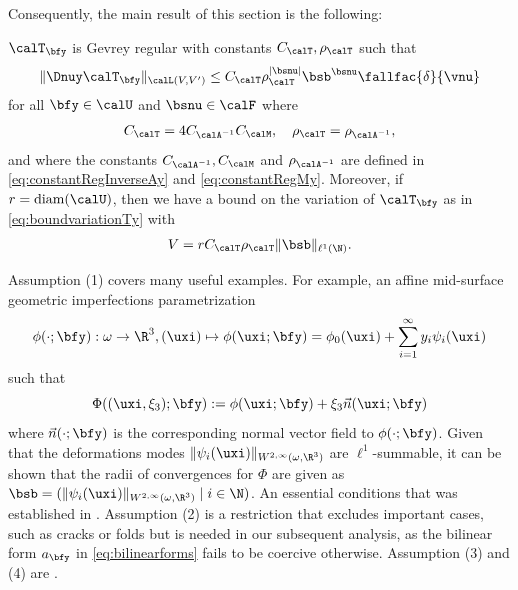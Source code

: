 
Consequently, the main result of this section is
the following:

\begin{lemma}\label{lemma:GevreyRegularityTy}
$\calT_{\bfy}$ is Gevrey regular with constants $C_{\calT}, \rho_{\calT}$
such that 
\begin{align*}
   \| \Dnuy  \calT_{\bfy} \|_{\calL(V,V')} 
   \leq  C_{\calT} \rho_{\calT}^{\vert \bsnu \vert}\bsb^{\bsnu} \fallfac{\delta}{\vnu} 
\end{align*}
for all $\bfy \in \calU$ and $\bsnu \in \calF$ where
\begin{align}\label{eq:constantRegTy}
    C_{\calT} = 4C_{\calA^{-1}} C_{\calM}, \quad  \rho_{\calT}= \rho_{\calA^{-1}},
\end{align}
and where the constants $C_{\calA^{-1}},C_{\calM}$ and $\rho_{\calA^{-1}}$ are defined in \eqref{eq:constantRegInverseAy} and \eqref{eq:constantRegMy}.
Moreover, if $r = \text{diam}(\calU)$, then we have a bound on the variation of $\calT_\bfy$ as in \eqref{eq:boundvariationTy} with
\begin{align*}
    V = r C_\calT \rho_{\calT}  \| \bsb \|_{\ell^1(\N)}.
\end{align*}
\end{lemma}
\begin{remark}
    Assumption (1) covers many useful examples. For example, an affine mid-surface geometric imperfections parametrization
    \begin{equation*}     
   \phi(\cdot;\bfy): \omega \to \R^3, (\uxi) \mapsto \phi(\uxi;\bfy) = \phi_0(\uxi) +  \sum_{i =1 }^\infty y_i \psi_i(\uxi)
    \end{equation*}
    such that 
    \begin{equation*}
        \Phi ((\uxi,\xi_3) ; \bfy) := \phi(\uxi;\bfy) + \xi_3 \vec n(\uxi;\bfy)
    \end{equation*}
    where $ \vec n(\cdot;\bfy)$ is the corresponding normal vector field to $\phi(\cdot;\bfy)$.
    Given that the deformations modes $ \| \psi_i(\uxi) \|_{W^{2,\infty}(\omega,\R^3)} $ are $\ell^1$-summable, it can be shown that the radii of convergences for $\Phi$ are given as 
    $\bsb = (\| \psi_i(\uxi) \|_{W^{2,\infty}(\omega,\R^3)}   \mid i \in \N ) $. An essential conditions that was established in \cite{GIANI2025118081}.
    Assumption (2) is a restriction that excludes important cases, such as cracks or folds but is needed in our subsequent analysis, as the bilinear form $a_\bfy$ in \eqref{eq:bilinearforms} fails to be coercive otherwise. Assumption (3) and (4) are .
\end{remark}






